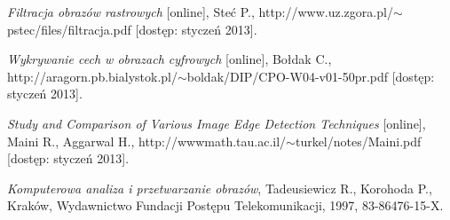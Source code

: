 \documentclass[a4paper,twocolumn,12pt]{article}
\begin{document}
\begin{thebibliography}{9}
 \small
 
  \emph{Filtracja obrazów rastrowych} [online],
  Steć P.,
  http://www.uz.zgora.pl/$\sim$pstec/files/filtracja.pdf [dostęp: styczeń 2013].
  
  \emph{Wykrywanie cech w obrazach cyfrowych} [online],
  Bołdak C.,
  http://aragorn.pb.bialystok.pl/$\sim$boldak/DIP/CPO-W04-v01-50pr.pdf [dostęp: styczeń 2013].
  
  \emph{Study and Comparison of Various Image Edge Detection Techniques} [online],
  Maini R., Aggarwal H.,
  http://wwwmath.tau.ac.il/$\sim$turkel/notes/Maini.pdf [dostęp: styczeń 2013].
 
  \emph{Komputerowa analiza i przetwarzanie obrazów},
  Tadeusiewicz R., Korohoda P.,
  Kraków,
  Wydawnictwo Fundacji Postępu Telekomunikacji,
  1997,
  83-86476-15-X.
  
\end{thebibliography}
\end{document}
